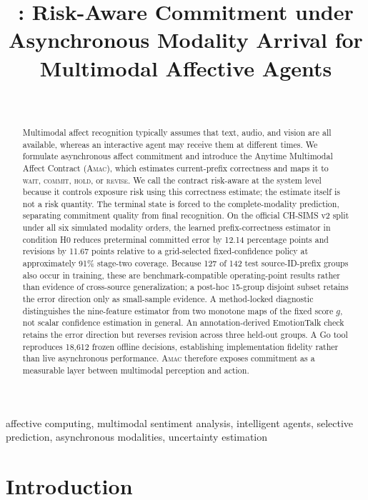 \documentclass[journal]{IEEEtran}
\title{\method: Risk-Aware Commitment under Asynchronous Modality Arrival for Multimodal Affective Agents}
\author{\todoauthor\\
\textit{\todoaffiliation}}
\newcommand{\method}{\textsc{Amac}}
\begin{document}
\maketitle

\begin{abstract}
Multimodal affect recognition typically assumes that text, audio, and vision are all available, whereas an interactive agent may receive them at different times. We formulate asynchronous affect commitment and introduce the Anytime Multimodal Affect Contract (\method), which estimates current-prefix correctness and maps it to \textsc{wait}, \textsc{commit}, \textsc{hold}, or \textsc{revise}. We call the contract risk-aware at the system level because it controls exposure risk using this correctness estimate; the estimate itself is not a risk quantity. The terminal state is forced to the complete-modality prediction, separating commitment quality from final recognition. On the official CH-SIMS v2 split under all six simulated modality orders, the learned prefix-correctness estimator in condition H0 reduces preterminal committed error by 12.14 percentage points and revisions by 11.67 points relative to a grid-selected fixed-confidence policy at approximately 91\% stage-two coverage. Because 127 of 142 test source-ID-prefix groups also occur in training, these are benchmark-compatible operating-point results rather than evidence of cross-source generalization; a post-hoc 15-group disjoint subset retains the error direction only as small-sample evidence. A method-locked diagnostic distinguishes the nine-feature estimator from two monotone maps of the fixed score $g$, not scalar confidence estimation in general. An annotation-derived EmotionTalk check retains the error direction but reverses revision across three held-out groups. A Go tool reproduces 18,612 frozen offline decisions, establishing implementation fidelity rather than live asynchronous performance. \method{} therefore exposes commitment as a measurable layer between multimodal perception and action.
\end{abstract}

\begin{IEEEkeywords}
affective computing, multimodal sentiment analysis, intelligent agents, selective prediction, asynchronous modalities, uncertainty estimation
\end{IEEEkeywords}

\section{Introduction}
\end{document}
